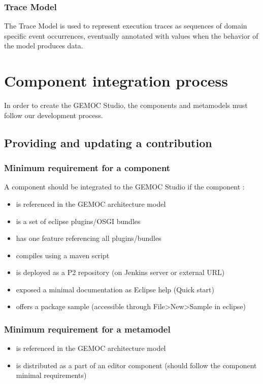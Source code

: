 \documentclass{gemoc} %
\begin{document}
\subsection{Trace Model}
\label{sec:Trace_Model}
The Trace Model is used to represent execution traces as sequences of domain specific event occurrences, eventually annotated with values when the behavior of the model produces data.


\chapter{Component integration process}
In  order to create the GEMOC Studio, the components and metamodels must follow our development process.

\section{Providing and updating a contribution}
\subsection{Minimum requirement for a component}
A component should be integrated to the GEMOC Studio if the component :
\begin{itemize}
	\item is referenced in the GEMOC architecture model
	\item is a set of eclipse plugins/OSGI bundles
	\item has one feature referencing all plugins/bundles
	\item compiles using a maven script
	\item is deployed as a P2 repository (on Jenkins server or external URL)
	\item exposed a minimal documentation as Eclipse help (Quick start)
	\item offers a package sample (accessible through File>New>Sample in eclipse)
\end{itemize}
\subsection{Minimum requirement for a metamodel}
\begin{itemize}
	\item is referenced in the GEMOC architecture model
	\item is distributed as a part of an editor component (should follow the component minimal requirements)
\end{itemize}
\end{document}
